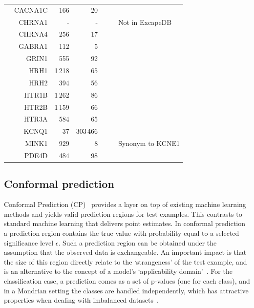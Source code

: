 \documentclass[utf8]{frontiersSCNS} %
\begin{document}
\begin{table}[p]
\begin{tabular}{crrrrcl}
&    CACNA1C &       166     &       20          &            &       &       \\
&    CHRNA1  &       -       &       -           &            &       & Not in ExcapeDB \\
&    CHRNA4  &       256     &       17          &            &       &       \\
&    GABRA1  &       112     &       5           &            &       &       \\
&    GRIN1   &       555     &       92          &            &       &       \\
&    HRH1    &       1\,218  &       65          &            &       &       \\
&    HRH2    &       394     &       56          &            &       &       \\
&    HTR1B   &       1\,262  &       86          &            &       &       \\
&    HTR2B   &       1\,159  &       66          &            &       &       \\
&    HTR3A   &       584     &       65          &            &       &       \\
&    KCNQ1   &       37      &       303\,466    &            &       &       \\
&    MINK1   &       929     &       8           &            &       & Synonym to KCNE1 \\
&    PDE4D   &       484     &       98          &            &       &       \\

\bottomrule
\end{tabular}
\end{table}

\subsection*{Conformal prediction}
Conformal Prediction (CP)~\cite{Vovk2005} provides a layer on top of
existing machine learning methods and yields valid prediction regions for test
examples. This contrasts to standard machine learning that delivers point
estimates. In conformal prediction a prediction region contains the true
value with probability equal to a selected significance level $\epsilon$. Such
a prediction region can be obtained under the assumption that the observed data
is exchangeable. An important impact is that the size of this region directly
relate to the `strangeness' of the test example, and is an alternative to the
concept of a model's `applicability domain'~\cite{norinder2014introducing}. For
the classification case, a prediction comes as a set of p-values (one for each
class), and in a Mondrian setting the classes are handled independently,
which has attractive properties when dealing with imbalanced
datasets~\cite{Norinder:2017qc,Sun:2017qm}.
\end{document}
